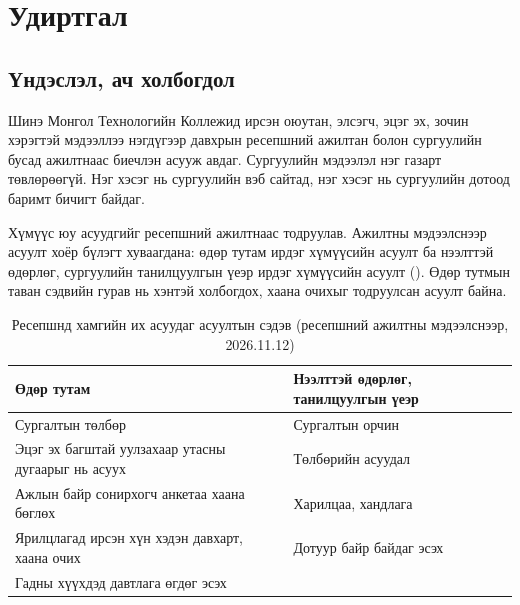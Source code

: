 \chapter{Удиртгал}
\label{ch:introduction}

%

\section{Үндэслэл, ач холбогдол}
\label{sec:intro-background}

Шинэ Монгол Технологийн Коллежид ирсэн оюутан, элсэгч, эцэг эх, зочин хэрэгтэй мэдээллээ нэгдүгээр давхрын ресепшний ажилтан болон сургуулийн бусад ажилтнаас биечлэн асууж авдаг. Сургуулийн мэдээлэл нэг газарт төвлөрөөгүй. Нэг хэсэг нь сургуулийн вэб сайтад, нэг хэсэг нь сургуулийн дотоод баримт бичигт байдаг.

Хүмүүс юу асуудгийг ресепшний ажилтнаас тодруулав. Ажилтны мэдээлснээр асуулт хоёр бүлэгт хуваагдана: өдөр тутам ирдэг хүмүүсийн асуулт ба нээлттэй өдөрлөг, сургуулийн танилцуулгын үеэр ирдэг хүмүүсийн асуулт (). Өдөр тутмын таван сэдвийн гурав нь хэнтэй холбогдох, хаана очихыг тодруулсан асуулт байна.

\begin{table}[ht]
\centering
\caption{Ресепшнд хамгийн их асуудаг асуултын сэдэв (ресепшний ажилтны мэдээлснээр, 2026.11.12)}
\label{tab:reception_topics}
\begin{tabular}{|p{6.8cm}|p{6.8cm}|}
\hline
\textbf{Өдөр тутам} & \textbf{Нээлттэй өдөрлөг, танилцуулгын үеэр} \\
\hline
Сургалтын төлбөр & Сургалтын орчин \\
\hline
Эцэг эх багштай уулзахаар утасны дугаарыг нь асуух & Төлбөрийн асуудал \\
\hline
Ажлын байр сонирхогч анкетаа хаана бөглөх & Харилцаа, хандлага \\
\hline
Ярилцлагад ирсэн хүн хэдэн давхарт, хаана очих & Дотуур байр байдаг эсэх \\
\hline
Гадны хүүхдэд давтлага өгдөг эсэх & \\
\hline
\end{tabular}
\end{table}

